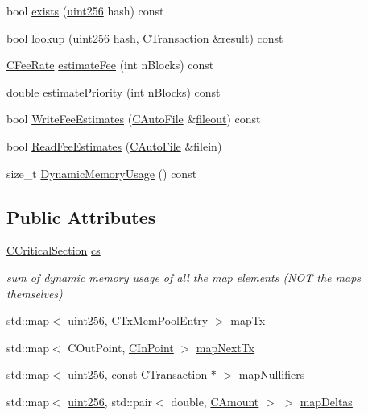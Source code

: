 \begin{DoxyCompactItemize}
bool \mbox{\hyperlink{class_c_tx_mem_pool_a8b7a13b5289ab839d4460f41a7da9789}{exists}} (\mbox{\hyperlink{classuint256}{uint256}} hash) const
\item 
bool \mbox{\hyperlink{class_c_tx_mem_pool_ad6d9966cdeb4b6586f7186e709b4e77e}{lookup}} (\mbox{\hyperlink{classuint256}{uint256}} hash, C\+Transaction \&result) const
\item 
\mbox{\hyperlink{class_c_fee_rate}{C\+Fee\+Rate}} \mbox{\hyperlink{class_c_tx_mem_pool_a32dd66c128330aed86865c8a61857c6c}{estimate\+Fee}} (int n\+Blocks) const
\item 
double \mbox{\hyperlink{class_c_tx_mem_pool_a225378304025c093d2dc5fcb754ade3b}{estimate\+Priority}} (int n\+Blocks) const
\item 
bool \mbox{\hyperlink{class_c_tx_mem_pool_a251f595b6527be005634574ce5d01f70}{Write\+Fee\+Estimates}} (\mbox{\hyperlink{class_c_auto_file}{C\+Auto\+File}} \&\mbox{\hyperlink{util_8cpp_a5256be9be45ec4d0909f14a61d455e23}{fileout}}) const
\item 
bool \mbox{\hyperlink{class_c_tx_mem_pool_a0dbbcb6a3b7e1a6c564410668c12cd4f}{Read\+Fee\+Estimates}} (\mbox{\hyperlink{class_c_auto_file}{C\+Auto\+File}} \&filein)
\item 
size\+\_\+t \mbox{\hyperlink{class_c_tx_mem_pool_a4fcf05ad5f15a565c4b43c4b9f29906e}{Dynamic\+Memory\+Usage}} () const
\end{DoxyCompactItemize}
\subsection*{Public Attributes}
\begin{DoxyCompactItemize}
\item 
\mbox{\hyperlink{sync_8h_a37a4692b2d517f2843655ca11af7668a}{C\+Critical\+Section}} \mbox{\hyperlink{class_c_tx_mem_pool_ac7ee8c06837c7d2688e2d7e3d071bdbb}{cs}}
\begin{DoxyCompactList}\small\item\em sum of dynamic memory usage of all the map elements (N\+OT the maps themselves) \end{DoxyCompactList}\item 
std\+::map$<$ \mbox{\hyperlink{classuint256}{uint256}}, \mbox{\hyperlink{class_c_tx_mem_pool_entry}{C\+Tx\+Mem\+Pool\+Entry}} $>$ \mbox{\hyperlink{class_c_tx_mem_pool_a5cd374a559b02a6485ca8cef769f9930}{map\+Tx}}
\item 
std\+::map$<$ C\+Out\+Point, \mbox{\hyperlink{class_c_in_point}{C\+In\+Point}} $>$ \mbox{\hyperlink{class_c_tx_mem_pool_aae6f1162f0b2e42b369971f32a9f71e8}{map\+Next\+Tx}}
\item 
std\+::map$<$ \mbox{\hyperlink{classuint256}{uint256}}, const C\+Transaction $\ast$ $>$ \mbox{\hyperlink{class_c_tx_mem_pool_a1398b975c8c073096843991133a7bf0a}{map\+Nullifiers}}
\item 
std\+::map$<$ \mbox{\hyperlink{classuint256}{uint256}}, std\+::pair$<$ double, \mbox{\hyperlink{amount_8h_a4eaf3a5239714d8c45b851527f7cb564}{C\+Amount}} $>$ $>$ \mbox{\hyperlink{class_c_tx_mem_pool_a341709e31a39ce7a7a951a85c775c589}{map\+Deltas}}
\end{DoxyCompactItemize}
